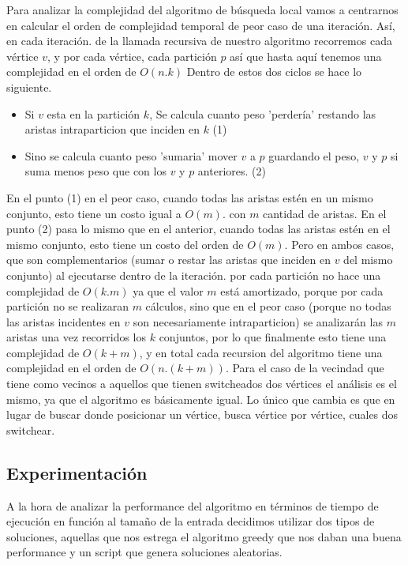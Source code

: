 Para analizar la complejidad del algoritmo de búsqueda local vamos a centrarnos en calcular el orden de complejidad temporal de peor caso de una iteración.
Así, en cada iteración. de la llamada recursiva de nuestro algoritmo recorremos cada vértice $v$, y por cada vértice, cada partición $p$ así que hasta aquí tenemos una complejidad en el orden de $O(n.k)$
Dentro de estos dos ciclos se hace lo siguiente.
\begin{itemize}
\item Si $v$ esta en la partición $k$, Se calcula cuanto peso 'perdería' restando las aristas intraparticion que inciden en $k$ (1)
\item Sino se calcula cuanto peso 'sumaria' mover $v$ a $p$ guardando el peso, $v$ y $p$ si suma menos peso que con los $v$ y $p$ anteriores. (2)
\end{itemize}
En el punto (1) en el peor caso, cuando todas las aristas estén en un mismo conjunto, esto tiene un costo igual a $O(m)$. con $m$ cantidad de aristas.  En el punto (2) pasa lo mismo que en el anterior, cuando todas las aristas estén en el mismo conjunto, esto tiene un costo del orden de $O(m)$.
Pero en ambos casos, que son complementarios (sumar o restar las aristas que inciden en $v$ del mismo conjunto) al ejecutarse dentro de la iteración. por cada partición no hace una complejidad de $O(k.m)$ ya que el valor $m$ está amortizado, porque por cada partición no se realizaran $m$ cálculos, sino que en el peor caso (porque no todas las aristas incidentes en $v$ son necesariamente intraparticion) se analizarán las $m$ aristas una vez recorridos los $k$ conjuntos, por lo que finalmente esto tiene una complejidad de $O(k+m)$, y en total cada recursion del algoritmo tiene una complejidad en el orden de $O(n.(k+m))$.
Para el caso de la vecindad que tiene como vecinos a aquellos que tienen switcheados dos vértices el análisis es el mismo, ya que el algoritmo es básicamente igual. Lo único que cambia es que en lugar de buscar donde posicionar un vértice, busca vértice por vértice, cuales dos switchear.


\subsection{Experimentación}

A la hora de analizar la performance del algoritmo en términos de tiempo de ejecución en función al tamaño de la entrada decidimos utilizar dos tipos de soluciones, aquellas que nos estrega el algoritmo greedy que nos daban una buena performance y un script que genera soluciones aleatorias.

